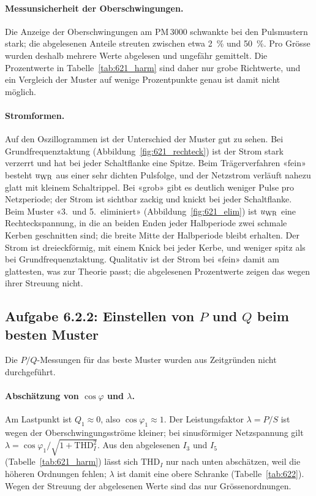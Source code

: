 \paragraph{Messunsicherheit der Oberschwingungen.} Die Anzeige der Oberschwingungen am PM\,3000 schwankte bei den Pulsmustern stark; die abgelesenen Anteile streuten zwischen etwa \SI{2}{\percent} und \SI{50}{\percent}. Pro Grösse wurden deshalb mehrere Werte abgelesen und ungefähr gemittelt. Die Prozentwerte in Tabelle~\ref{tab:621_harm} sind daher nur grobe Richtwerte, und ein Vergleich der Muster auf wenige Prozentpunkte genau ist damit nicht möglich.

\paragraph{Stromformen.} Auf den Oszillogrammen ist der Unterschied der Muster gut zu sehen. Bei Grundfrequenztaktung (Abbildung~\ref{fig:621_rechteck}) ist der Strom stark verzerrt und hat bei jeder Schaltflanke eine Spitze. Beim Trägerverfahren «fein» besteht $u_{\mathrm{WR}}$ aus einer sehr dichten Pulsfolge, und der Netzstrom verläuft nahezu glatt mit kleinem Schaltrippel. Bei «grob» gibt es deutlich weniger Pulse pro Netzperiode; der Strom ist sichtbar zackig und knickt bei jeder Schaltflanke. Beim Muster «3.\ und 5.\ eliminiert» (Abbildung~\ref{fig:621_elim}) ist $u_{\mathrm{WR}}$ eine Rechteckspannung, in die an beiden Enden jeder Halbperiode zwei schmale Kerben geschnitten sind; die breite Mitte der Halbperiode bleibt erhalten. Der Strom ist dreieckförmig, mit einem Knick bei jeder Kerbe, und weniger spitz als bei Grundfrequenztaktung. Qualitativ ist der Strom bei «fein» damit am glattesten, was zur Theorie passt; die abgelesenen Prozentwerte zeigen das wegen ihrer Streuung nicht.

\subsection{Aufgabe 6.2.2: Einstellen von \texorpdfstring{$P$ und $Q$}{P und Q} beim besten Muster}
\label{sec:messung622}

Die $P/Q$-Messungen für das beste Muster wurden aus Zeitgründen nicht durchgeführt.

\paragraph{Abschätzung von $\cos\varphi$ und $\lambda$.} Am Lastpunkt ist $Q_1\approx0$, also $\cos\varphi_1\approx1$. Der Leistungsfaktor $\lambda=P/S$ ist wegen der Oberschwingungsströme kleiner; bei sinusförmiger Netzspannung gilt $\lambda=\cos\varphi_1/\sqrt{1+\mathrm{THD}_I^2}$. Aus den abgelesenen $I_3$ und $I_5$ (Tabelle~\ref{tab:621_harm}) lässt sich $\mathrm{THD}_I$ nur nach unten abschätzen, weil die höheren Ordnungen fehlen; $\lambda$ ist damit eine obere Schranke (Tabelle~\ref{tab:622}). Wegen der Streuung der abgelesenen Werte sind das nur Grössenordnungen.

